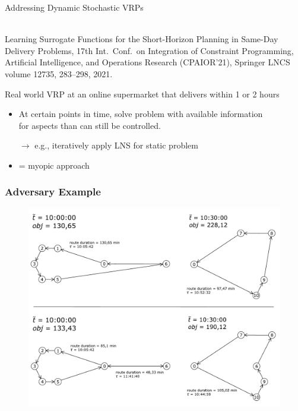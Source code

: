 \documentclass[aspectratio=1610]{beamer}
\newcommand{\important}[1]{{\color{green!60!black}#1}}
\begin{document}
\begin{frame}{Addressing Dynamic Stochastic VRPs}

 \cite{bracher-21}\\
{\small\important{Learning Surrogate Functions for the Short-Horizon Planning in Same-Day Delivery Problems}, 17th Int.\ Conf.\ on Integration of Constraint Programming, Artificial Intelligence, and Operations Research (CPAIOR'21), Springer LNCS volume 12735, 283--298, 2021.}

\bigskip
{} \important{Real world VRP} at an online supermarket that \important{delivers within 1 or 2 hours}

\bigskip
{}

\begin{itemize}
	\itemsep2ex
	\item At certain points in time, solve problem with available information\\ for aspects than can still be controlled.
	
	\item[$\rightarrow$] e.g., iteratively apply LNS for static problem
	\item = \important{myopic approach}
\end{itemize}

\end{frame}

\begin{frame}
	\frametitle{Adversary Example}
	\begin{figure}[tb]
		\centering
		\includegraphics[width=.80\columnwidth]{graphics/illustrative_example.pdf}
	\end{figure}
\end{frame}
\end{document}
